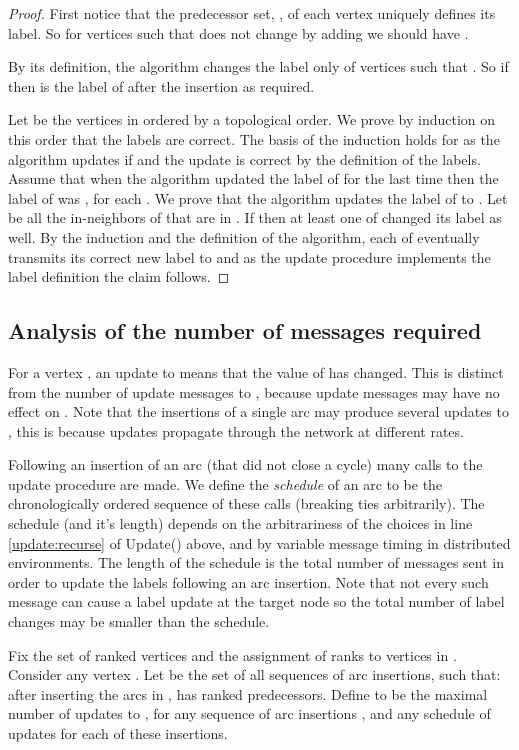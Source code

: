 \documentclass[11pt]{article}
\theoremstyle{plain}
\theoremstyle{definition}
\theoremstyle{remark}
\numberwithin{equation}{section}
\begin{document}
\begin{proof}
First notice that the predecessor set, , of each vertex 
uniquely defines its label. So for vertices  such that 
does not change by adding  we should have
.

By its definition, the algorithm changes the label only of vertices
 such that . So if   then
 is the label of  after the
insertion as required.


Let  be the vertices in  ordered by a
topological order. We prove by induction on this order that the
labels are correct. The basis of the induction holds for  as
the algorithm updates  if  and
the update is correct by the definition of the labels. Assume that
when the algorithm updated the label  of  for the last time then the label of  was
, for each . We prove that the
algorithm updates the label of  to . Let
 be all the in-neighbors of  that are in . If
  then  at least one of
 changed its label as well. By
the induction and the definition of the algorithm, each of
  eventually transmits its
correct new label to  and as the update  procedure implements
the label definition the claim follows.

\end{proof}


\subsection{Analysis of the number of messages required}
\label{sec:analysis}

For a vertex , an update to  means that the value of
 has changed. This is distinct from the number of update
messages to , because update messages may have no effect on
. Note that the insertions of a single arc may produce
several updates to , this is because updates propagate
through the network at different rates.

Following an insertion of an arc  (that did not close a cycle)
many calls to the update procedure are made. We define the {\em
schedule} of an arc  to be the chronologically ordered sequence
of these calls (breaking ties arbitrarily). The schedule (and it's
length) depends on the arbitrariness of the choices in line
\ref{update:recurse} of Update() above, and by variable message
timing in distributed environments. The length of the schedule is
the total number of messages sent in order to update the labels
following an arc insertion. Note that not every such message can
cause a label update at the target node so the total number of label
changes may be smaller than the schedule.


Fix the set of ranked vertices  and the assignment  of ranks
to vertices in . Consider any vertex . Let  be
the set of all sequences of arc insertions, such that: after
inserting the arcs in ,   has   ranked
predecessors. Define  to be the maximal number of updates
to , for any sequence of arc insertions , and any schedule of updates for each of these
insertions.
\end{document}
